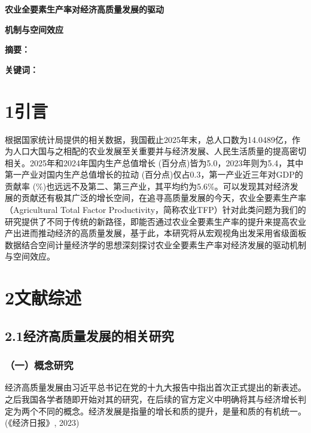\documentclass[UTF8,a4paper,12pt,fontset=windows]{ctexart}
\begin{document}
\pagestyle{plain}
\begin{center}
  {\bfseries 农业全要素生产率对经济高质量发展的驱动\par}
  \vspace{0.8em}
  {\bfseries 机制与空间效应\par}
\end{center}
\vspace{1.5em}
\noindent\textbf{摘要：}\par
\noindent\textbf{关键词：}\par
\vspace{1em}
\section{1引言}\label{ux5f15ux8a00}

根据国家统计局提供的相关数据，我国截止2025年末，总人口数为14.0489亿，作为人口大国与之相配的农业发展至关重要并与经济发展、人民生活质量的提高密切相关。2025年和2024年国内生产总值增长 (百分点)皆为5.0，2023年则为5.4，其中第一产业对国内生产总值增长的拉动 (百分点)仅占0.3，第一产业近三年对GDP的贡献率 (\%)也远远不及第二、第三产业，其平均约为5.6\%。可以发现其对经济发展的贡献还有极其广泛的增长空间，在追寻高质量发展的今天，农业全要素生产率（Agricultural Total Factor Productivity，简称农业TFP）针对此类问题为我们的研究提供了不同于传统的新路径，即能否通过农业全要素生产率的提升来提高农业产出进而推动经济的高质量发展，基于此，本研究将从宏观视角出发采用省级面板数据结合空间计量经济学的思想深刻探讨农业全要素生产率对经济发展的驱动机制与空间效应。

\section{2文献综述}\label{ux6587ux732eux7efcux8ff0}

\subsection{2.1经济高质量发展的相关研究}\label{ux7ecfux6d4eux9ad8ux8d28ux91cfux53d1ux5c55ux7684ux76f8ux5173ux7814ux7a76}

\subsubsection{（一）概念研究}\label{ux4e00ux6982ux5ff5ux7814ux7a76}

经济高质量发展由习近平总书记在党的十九大报告中指出首次正式提出的新表述。之后我国各学者随即开始对其的研究，在后续的官方定义中明确将其与经济增长判定为两个不同的概念。经济发展是指量的增长和质的提升，是量和质的有机统一。 (《经济日报》, 2023)
\end{document}
